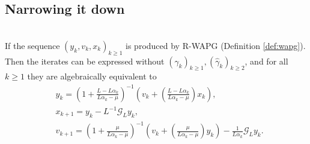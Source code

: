 \documentclass[12pt]{article}
\begin{document}
    \subsection{Narrowing it down}
        \begin{proposition}\label{prop:wapg-first-equivalent-repr}\;\\
            If the sequence $(y_k, v_k, x_k)_{k \ge 1}$ is produced by R-WAPG (Definition \ref{def:wapg}). 
            Then the iterates can be expressed without $(\gamma_k)_{k \ge1},(\hat \gamma_k)_{k \ge 2}$, and for all $k\ge 1$ they are algebraically equivalent to
            \begin{align*}
                & 
                y_{k} = 
                \left(
                    1 + \frac{L - L\alpha_{k}}{L\alpha_{k} - \mu}
                \right)^{-1}
                \left(
                    v_{k} + 
                    \left(\frac{L - L\alpha_{k}}{L\alpha_{k} - \mu} \right) x_{k}
                \right), 
                \\
                & x_{k + 1} = 
                y_k - L^{-1} \mathcal G_L y_k, 
                \\
                & v_{k + 1} = 
                \left(
                    1 + \frac{\mu}{L \alpha_k - \mu}
                \right)^{-1}
                \left(
                    v_k + 
                    \left(\frac{\mu}{L \alpha_k - \mu}\right) y_k
                \right) - \frac{1}{L\alpha_{k}}\mathcal G_L y_k. 
            \end{align*}
            
        \end{proposition}
\end{document}
